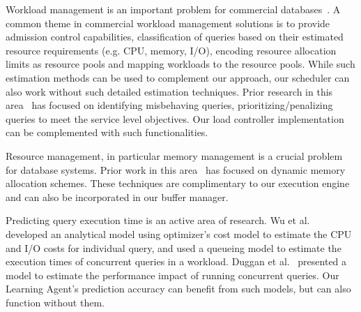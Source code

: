 
Workload management is an important problem for commercial databases~\cite{res_gov, rm, DB2, teradatawm, gpdb, hpwm}. 
A common theme in commercial workload management solutions is to provide admission control capabilities, classification of queries based on their estimated resource requirements (e.g. CPU, memory, I/O), encoding resource allocation limits as resource pools and mapping workloads to the resource pools. 
While such estimation methods can be used to complement our approach, 
our scheduler can also work without such detailed estimation techniques. 
Prior research in this area~\cite{krompass2007dynamic, krompass2006quality} has focused on identifying misbehaving queries, prioritizing/penalizing queries to meet the service level objectives.
Our load controller implementation can be complemented with such functionalities.


Resource management, in particular memory management is a crucial problem for database systems. 
Prior work in this area~\cite{mehta1993dynamic, davison1995dynamic} has focused on dynamic memory allocation schemes.
These techniques are complimentary to our execution engine and can also be incorporated in our buffer manager. 

Predicting query execution time is an active area of research. 
Wu et al.~\cite{wu2013towards, wu2014uncertainty} developed an analytical model using optimizer's cost model to estimate the CPU and I/O costs for individual query, and used a queueing model to estimate the execution times of concurrent queries in a workload.
Duggan et al.~\cite{duggan2011performance} presented a model to estimate the performance impact of running concurrent queries.
Our Learning Agent's prediction accuracy can benefit from such models, but can also function without them. 

